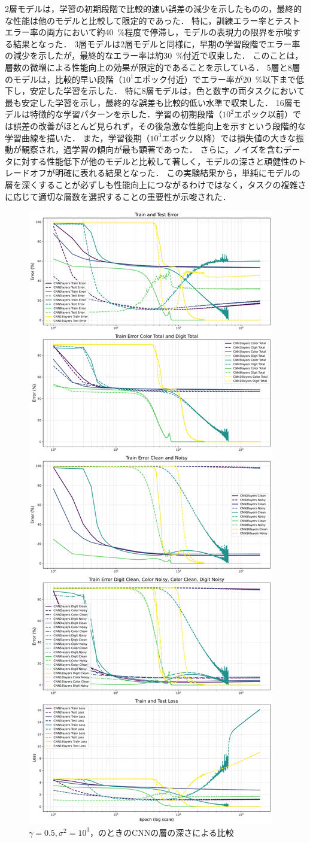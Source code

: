 2層モデルは，学習の初期段階で比較的速い誤差の減少を示したものの，最終的な性能は他のモデルと比較して限定的であった．
特に，訓練エラー率とテストエラー率の両方において約\SI{40}{\percent}程度で停滞し，モデルの表現力の限界を示唆する結果となった．
3層モデルは2層モデルと同様に，早期の学習段階でエラー率の減少を示したが，最終的なエラー率は約\SI{30}{\percent}付近で収束した．
このことは，層数の微増による性能向上の効果が限定的であることを示している．
5層と8層のモデルは，比較的早い段階（$10^1$エポック付近）でエラー率が\SI{20}{\percent}以下まで低下し，安定した学習を示した．
特に8層モデルは，色と数字の両タスクにおいて最も安定した学習を示し，最終的な誤差も比較的低い水準で収束した．
16層モデルは特徴的な学習パターンを示した．学習の初期段階（$10^2$エポック以前）では誤差の改善がほとんど見られず，その後急激な性能向上を示すという段階的な学習曲線を描いた．
また，学習後期（$10^3$エポック以降）では損失値の大きな振動が観察され，過学習の傾向が最も顕著であった．
さらに，ノイズを含むデータに対する性能低下が他のモデルと比較して著しく，モデルの深さと頑健性のトレードオフが明確に表れる結果となった．
この実験結果から，単純にモデルの層を深くすることが必ずしも性能向上につながるわけではなく，タスクの複雑さに応じて適切な層数を選択することの重要性が示唆された．

\begin{figure}[H]
    \centering
    \includegraphics[width=0.4\linewidth]{fig/layer_comparison/cnn_layers_comparison.pdf}
    \caption{$\gamma = 0.5, \sigma^2 = 10^3$，のときのCNNの層の深さによる比較}
    \label{fig:cnn_layers_comparison}
\end{figure}

